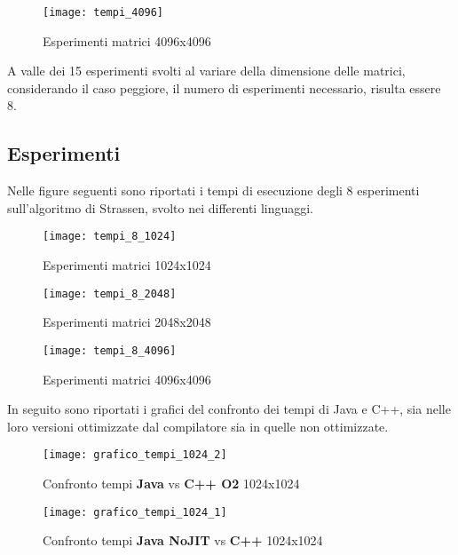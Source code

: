 \begin{figure}[!htbp]
  \texttt{[image: tempi\_4096]}
  \caption{Esperimenti matrici 4096x4096}
  \label{tempi_4096}
\end{figure}

\clearpage

A valle dei 15 esperimenti svolti al variare della dimensione delle matrici,
considerando il caso peggiore, il numero di esperimenti necessario,
risulta essere 8.\\

\subsection{Esperimenti}

Nelle figure seguenti sono riportati i tempi di esecuzione degli 8 esperimenti
sull'algoritmo di Strassen, svolto nei differenti linguaggi.\\

\begin{figure}[!htbp]
  \texttt{[image: tempi\_8\_1024]}
  \caption{Esperimenti matrici 1024x1024}
  \label{tempi_8_1024}
\end{figure}

\begin{figure}[!htbp]
  \texttt{[image: tempi\_8\_2048]}
  \caption{Esperimenti matrici 2048x2048}
  \label{tempi_8_2048}
\end{figure}

\begin{figure}[!htbp]
  \texttt{[image: tempi\_8\_4096]}
  \caption{Esperimenti matrici 4096x4096}
  \label{tempi_8_4096}
\end{figure}

\clearpage

In seguito sono riportati i grafici del confronto dei tempi di Java e C++, sia
nelle loro versioni ottimizzate dal compilatore sia in quelle non ottimizzate.\\

\begin{figure}[!htbp]
  \texttt{[image: grafico\_tempi\_1024\_2]}
  \caption{Confronto tempi \textbf{Java} vs \textbf{C++ O2} 1024x1024}
  \label{grafico_tempi_1024_2}
\end{figure}

\begin{figure}[!htbp]
  \texttt{[image: grafico\_tempi\_1024\_1]}
  \caption{Confronto tempi \textbf{Java NoJIT} vs \textbf{C++} 1024x1024}
  \label{grafico_tempi_1024_1}
\end{figure}

